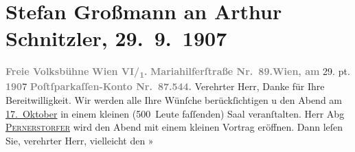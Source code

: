

         
         \renewcommand{\erwaehntePersonen}{Personen: Engelbert Pernerstorfer}
         \renewcommand{\erwaehnteInstitutionen}{Institutionen: Wiener Freie Volksbühne}
         \renewcommand{\erwaehnteOrte}{Orte: Mariahilferstraße, VI., Mariahilf, Wien}
         \renewcommand{\erwaehnteWerke}{Werke: Das neue Lied, Lieutenant Gustl. Novelle}
               \section[Stefan Großmann an Arthur Schnitzler, 29. 9. 1907]{ Stefan Großmann an Arthur Schnitzler, 29. 9. 1907}\nopagebreak{}\rehead{ }\begin{ledgroupsized}[t]{13cm}\normalsize\beginnumbering \toendnotes[C]{\smallbreak\pagebreak[2]} 
\toendnotes[C]{\smallbreak}\pstart
           \noindent{}{\pb}\textcolor{gray}{\textbf{Freie Volksbühne}}\pend
           \pstart
           \textcolor{gray}{\textbf{Wien VI/\textsubscript{1}.}}\pend
           \pstart
           \textcolor{gray}{\textbf{Mariahilferſtraße Nr. 89.}}\hfill \textcolor{gray}{\textbf{Wien, am}}{ }29. \damage{\textcolor{gray}{Se}}pt. \textcolor{gray}{\textbf{190}}7\pend
           \pstart
           \textcolor{gray}{\textbf{Poſtſparkaſſen-Konto Nr. 87.544.}}\pend
           \pstart\center{}Verehrter Herr,\pend\pstart
           Danke für Ihre Bereitwilligkeit.\pend
           \pstart
           Wir werden alle Ihre Wünſche berückſichtigen u den Abend am \uline{17. Oktober} in einem kleinen (500 Leute faſſenden) Saal veranſtalten. Herr Abg \uline{\textsc{Pernerstorfer}} wird den Abend mit einem kleinen Vortrag eröffnen. Dann leſen Sie, verehrter
               Herr, vielleicht den »\label{T_L01714_1v}
\end{ledgroupsized}
